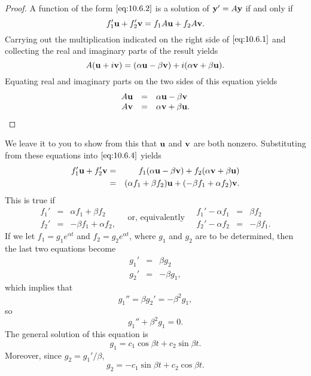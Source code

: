 \documentclass{ximera}
\begin{document}
\begin{proof}
A function of the form $\eqref{eq:10.6.2}$ is a solution of ${\bf y}'=A{\bf
y}$ if and only if
\begin{equation} \label{eq:10.6.4}
f_1'{\bf u}+f_2'{\bf
v}=f_1A{\bf u}+f_2A{\bf v}.
\end{equation}
Carrying out the multiplication indicated on the  right side
of $\eqref{eq:10.6.1}$ and collecting the  real and imaginary parts of the
result yields
$$
A({\bf u}+i{\bf v})=(\alpha{\bf u}-\beta{\bf v})+i(\alpha{\bf v}+\beta{\bf
u}).
$$
Equating real and imaginary parts on the two sides of this equation yields
$$
\begin{array}{rcl}
A{\bf u}&=&\alpha{\bf u}-\beta{\bf v}\\
A{\bf v}&=&\alpha{\bf v}+\beta{\bf u}.
\end{array}
$$
\end{proof}
We leave it to you %
to show from this that
${\bf u}$ and
${\bf v}$ are both nonzero.
Substituting from these equations into $\eqref{eq:10.6.4}$ yields
\begin{eqnarray*}
f_1'{\bf u}+f_2'{\bf v}
&=&f_1(\alpha{\bf u}-\beta{\bf v})+f_2(\alpha{\bf v}+\beta{\bf u})\\
&=&(\alpha f_1+\beta f_2){\bf u}+(-\beta f_1+\alpha f_2){\bf v}.
\end{eqnarray*}
This is true if
$$
\begin{array}{rcr}
f_1'&=&\alpha f_1+\beta f_2\\
f_2'&=&-\beta f_1+\alpha f_2,
\end{array}
\quad\mbox{or, equivalently}\quad
\begin{array}{rcr}
f_1'-\alpha f_1&=&\beta f_2\\
f_2'-\alpha f_2&=&-\beta f_1.
\end{array}
$$
If we let $f_1=g_1e^{\alpha t}$ and $f_2=g_2e^{\alpha t}$, where
$g_1$ and $g_2$ are to be determined, then the last two equations
become
$$
\begin{array}{rcr}
g_1'&=&\beta g_2\\
g_2'&=&-\beta g_1,
\end{array}
$$
which implies that
$$
g_1''=\beta g_2'=-\beta^2 g_1,
$$
so
$$
g_1''+\beta^2 g_1=0.
$$
The general solution of this equation is
$$
g_1=c_1\cos\beta t+c_2\sin\beta t.
$$
Moreover, since $g_2=g_1'/\beta$,
$$
g_2=-c_1\sin\beta t+c_2\cos\beta t.
$$
\end{document}
